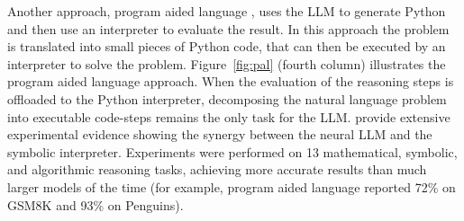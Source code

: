 Another approach, program aided language  \citep{gao2023pal}, uses the LLM to generate Python and then use an interpreter to evaluate the result. In this approach  the problem is translated into small pieces of Python code, that can then be executed by an interpreter to solve the problem.
Figure~\ref{fig:pal} (fourth column) illustrates the program aided language approach.
%
%
When the evaluation of the reasoning steps is offloaded  to the Python
interpreter, decomposing the natural language problem into executable
code-steps 
remains the only task for the LLM. %
%
\citet{gao2023pal} provide extensive experimental
evidence showing the synergy between the neural LLM and the symbolic interpreter.
Experiments were performed on 13 mathematical, symbolic, and algorithmic reasoning
tasks, achieving more accurate results than much larger
models of the time (for example, program aided language reported 72\% on GSM8K and  93\% on Penguins). %






